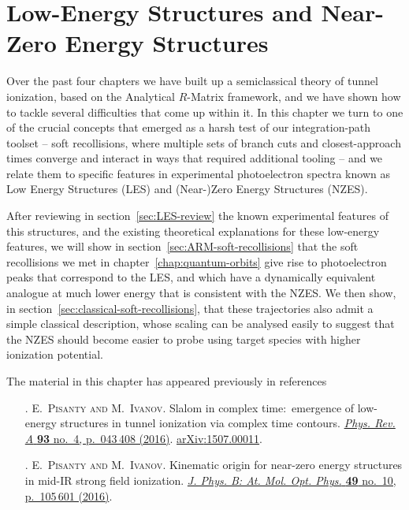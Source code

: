 \chapter{Low-Energy Structures and Near-Zero Energy Structures}
\label{chap:LES-NZES}

Over the past four chapters we have built up a semiclassical theory of tunnel ionization, based on the Analytical $R$-Matrix framework, and we have shown how to tackle several difficulties that come up within it. In this chapter we turn to one of the crucial concepts that emerged as a harsh test of our integration-path toolset -- soft recollisions, where multiple sets of branch cuts and closest-approach times converge and interact in ways that required additional tooling -- and we relate them to specific features in experimental photoelectron spectra known as Low Energy Structures (LES) and (Near-)Zero Energy Structures (NZES).

After reviewing in section~\ref{sec:LES-review} the known experimental features of this structures, and the existing theoretical explanations for these low-energy features, we will show in section~\ref{sec:ARM-soft-recollisions} that the soft recollisions we met in chapter~\ref{chap:quantum-orbits} give rise to photoelectron peaks that correspond to the LES, and which have a dynamically equivalent analogue at much lower energy that is consistent with the NZES. We then show, in section~\ref{sec:classical-soft-recollisions}, that these trajectories also admit a simple classical description, whose scaling can be analysed easily to suggest that the NZES should become easier to probe using target species with higher ionization potential.

The material in this chapter has appeared previously in references
\begin{enumerate}
\item[{\hypersetup{citecolor=black}\citealp{Pisanty_slalom_2016}}.]
\textsc{E.~Pisanty and M.~Ivanov}.
\newblock Slalom in complex time:\ emergence of low-energy structures in tunnel
  ionization via complex time contours.
\newblock \href{http://dx.doi.org/10.1103/PhysRevA.93.043408}{
          \emph{Phys. Rev. A} \textbf{93} no.~4, p.~043\,408 (2016)}.
\newblock \href{http://arxiv.org/abs/1507.00011}{{arXiv}:1507.00011}.

\item[{\hypersetup{citecolor=black}\citealp{Pisanty_kinematic_2016}}.]
\textsc{E.~Pisanty and M.~Ivanov}.
\newblock Kinematic origin for near-zero energy structures in mid-{IR} strong field ionization.
\newblock \href{http://dx.doi.org/10.1088/0953-4075/49/10/105601}{
          \emph{J. Phys. B: At. Mol. Opt. Phys.} \textbf{49} no.~10, p.~105\,601 (2016)}.
\end{enumerate}






